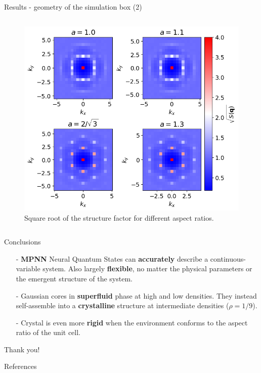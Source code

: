 \documentclass{beamer}
\begin{document}
\begin{frame}{Results - geometry of the simulation box (2)}
\begin{columns}
    \begin{column}{0.5\textwidth}
      \begin{figure}
        \centering
        \vspace{-0.75cm}
        \includegraphics[scale=0.35]{figures/structure_factor_diff_a.png}
        \caption{Square root of the structure factor for different aspect ratios.}
      \end{figure}
    \end{column}
  \end{columns}
\end{frame}

\begin{frame}{Conclusions}
\begin{itemize}
  \item[-]\textbf{MPNN} Neural Quantum States can \textbf{accurately} describe a continuous-variable system. 
  Also largely \textbf{flexible}, no matter the physical parameters or the emergent structure of the system.\\
  \vspace{0.3cm}
  \item[-]Gaussian cores in \textbf{superfluid} phase at high and low densities. They instead 
  self-assemble into a \textbf{crystalline} structure at intermediate densities ($\rho=1/9$).\\
  \vspace{0.3cm}
  \item[-]Crystal is even more \textbf{rigid} when the environment conforms to the aspect ratio of the unit cell.  
\end{itemize}
\vspace{2cm}
\begin{center}
{\huge  Thank you!}
\end{center}
\end{frame}
\begin{frame}{References}
  \printbibliography
\end{frame}
\end{document}
